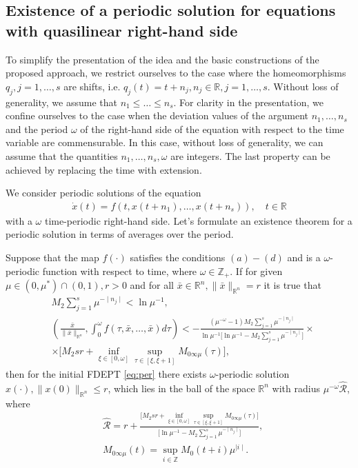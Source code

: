 \documentclass[
11pt,%
tightenlines,%
twoside,%
onecolumn,%
nofloats,%
nobibnotes,%
nofootinbib,%
superscriptaddress,%
noshowpacs,%
centertags,aps]%
{revtex4}
\begin{document}
\subsection{Existence of a periodic solution for equations with quasilinear right-hand side}
To simplify the presentation of the idea and the basic constructions of the proposed approach, we restrict ourselves to the case where the homeomorphisms $q_j, j=1,\ldots,s$ are shifts, i.e. $q_j(t)=t+n_j, n_j\in \mathbb R, j=1,\ldots,s$. Without loss of generality, we assume that $n_1\leq\ldots\leq n_s$. For clarity in the presentation, we confine ourselves to the case when the deviation values of the argument $n_1,\ldots,n_s$ and the period $\omega$ of the right-hand side of the equation with respect to the time variable are commensurable. In this case, without loss of generality, we can assume that the quantities $n_1,\ldots,n_s,\omega$ are integers. The last property can be achieved by replacing the time with extension.

We consider periodic solutions of the equation
\begin{eqnarray}
\dot x(t)=f\left(t,x(t+n_1),\ldots,x(t+n_s)\right),\quad t\in\mathbb R \label{eq:per}
\end{eqnarray}
with a $\omega$ time-periodic right-hand side. Let's formulate an existence theorem for a periodic solution in terms of averages over the period.

\begin{theorem}\label{thm2}
Suppose that the map $f(\cdot)$ satisfies the conditions $(a)-(d)$ and is a $\omega$-periodic function with respect to time, where $\omega \in \mathbb Z_+$. If for given $\mu\in(0,\mu^*)\cap(0,1), r>0$ and for all $\bar{x}\in \mathbb R^n,\|\bar{x}\|_{\mathbb R^n}=r$ it is true that
\begin{eqnarray*}
&M_2\sum_{j=1}^{s}\mu^{-\mid n_j \mid}<\ln \mu^{-1},\\
&\left(\frac{\bar{x}}{\|\bar{x}\|_{\mathbb R^n}},\int_0^\omega f(\tau,\bar{x},\ldots,\bar{x})d\tau\right)< - \frac{\left(\mu^{-\omega}-1 \right)M_2\sum_{j=1}^{s}\mu^{-\mid n_j \mid}}{\ln \mu^{-1}\big[\ln \mu^{-1}-M_2\sum_{j=1}^{s}\mu^{-\mid n_j \mid}\big]}\times\\
&\times \big[M_2 sr +\inf_{\xi\in [0,\omega]}\sup_{\tau\in [\xi,\xi+1]}M_{0 \infty {\mu}}(\tau) \big],
\end{eqnarray*}
then for the initial FDEPT \eqref{eq:per} there exists $\omega$-periodic solution $x(\cdot),\|x(0)\|_{\mathbb R^n}\leq r$, which lies in the ball of the space $\mathbb R^n$ with radius $\mu^{-\omega}\hat{\mathcal R}$, where
\begin{eqnarray*}
&\displaystyle{\hat{\mathcal R}=r+\frac{\big[M_2sr+\inf_{\xi\in [0,\omega]}\sup_{\tau\in [\xi,\xi+1]}M_{0 \infty{\mu}}(\tau)\big]}{\big[\ln \mu^{-1}-M_2\sum_{j=1}^{s}\mu^{-\mid n_j \mid}\big]}},\\
&M_{0\infty\mu}(t)=\sup_{i\in \mathbb Z} M_0(t+i)\mu^{\mid i\mid}.
\end{eqnarray*}
\end{theorem}
\end{document}

